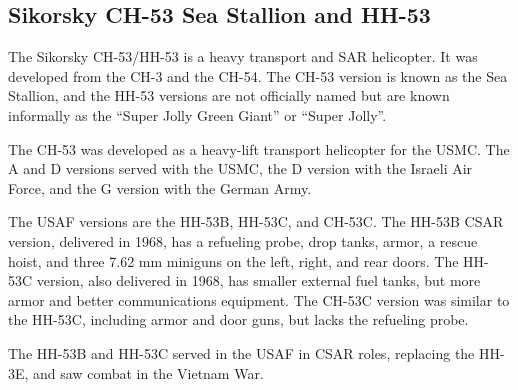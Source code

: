 

\subsection{Sikorsky CH-53 Sea Stallion and HH-53}

The Sikorsky CH-53/HH-53 is a heavy transport and SAR helicopter. It was developed from the CH-3 and the CH-54.  The CH-53 version is known as the Sea Stallion, and the HH-53 versions are not officially named but are known informally as the “Super Jolly Green Giant” or “Super Jolly”.

The CH-53 was developed as a heavy-lift transport helicopter for the USMC. The A and D versions served with the USMC, the D version with the Israeli Air Force, and the G version with the German Army.

The USAF versions are the HH-53B, HH-53C, and CH-53C. The HH-53B CSAR version, delivered in 1968, has a refueling probe, drop tanks, armor, a rescue hoist, and three 7.62 mm miniguns on the left, right, and rear doors. The HH-53C version, also delivered in 1968, has smaller external fuel tanks, but more armor and better communications equipment. The CH-53C version was similar to the HH-53C, including armor and door guns, but lacks the refueling probe.

The HH-53B and HH-53C served in the USAF in CSAR roles, replacing the HH-3E, and saw  combat in the Vietnam War.
